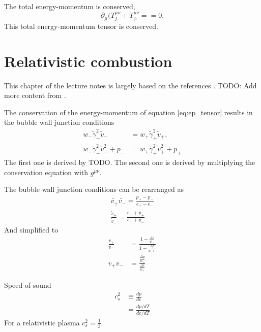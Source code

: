 The total energy-momentum is conserved,
\cite[eq. 5.17]{lecture_notes}
\begin{equation}
\partial_\mu (T_f^{\mu \nu} + T_\phi^{\mu \nu} = = 0.
\label{eq:ep_conservation}
\end{equation}
This total energy-momentum tensor is conserved.


\section{Relativistic combustion}
This chapter of the lecture notes is largely based on the references
\cites{hindmarsh_gw_pt_2019}{espinosa_energy_2010}.
TODO: Add more content from \cite[ch. 6]{mazumdar_review_2019}.

The conservation of the energy-momentum of equation \ref{eq:ep_tensor} results in the bubble wall junction conditions
\cites[eq. 7.22]{lecture_notes}[eq. B.2-3]{hindmarsh_gw_pt_2019}
\begin{align}
w_- \tilde{\gamma}_-^2 \tilde{v}_- &= w_+ \tilde{\gamma}_+^2 \tilde{v}_+, \\
w_- \tilde{\gamma}_-^2 \tilde{v}_-^2 + p_- &= w_+ \tilde{\gamma}_+^2 \tilde{v}_+^2 + p_+
\end{align}
The first one is derived by TODO.
The second one is derived by multiplying the conservation equation with $g^{\mu \nu}$. 

The bubble wall junction conditions can be rearranged as
\cites[eq. 7.32]{lecture_notes}[eq. 6-7]{giese_2020}
\begin{align}
\tilde{v_+} \tilde{v_-} = \frac{p_+ - p_-}{e_+ - e_-} \\
\frac{\tilde{v}_+}{\tilde{v}_-} = \frac{e_- + p_+}{e_+ + p_-}
\end{align}
And simplified to
\begin{align}
\frac{v_+}{v_-} &= \frac{1 - \frac{\Delta e}{w_+}}{1 - \frac{\Delta p}{w+}} \\
v_+ v_- &= \frac{\frac{\Delta p}{w_+}}{\frac{\Delta e}{w_+}}
\end{align}

Speed of sound
\cites[eq. 13]{giese_2020}[eq. 3]{giese_2021}
\begin{align}
c_s^2
&\equiv \frac{dp}{de} \\
&= \frac{dp/dT}{de/dT}
\end{align}
For a relativistic plasma $c_s^2=\frac{1}{3}$.


